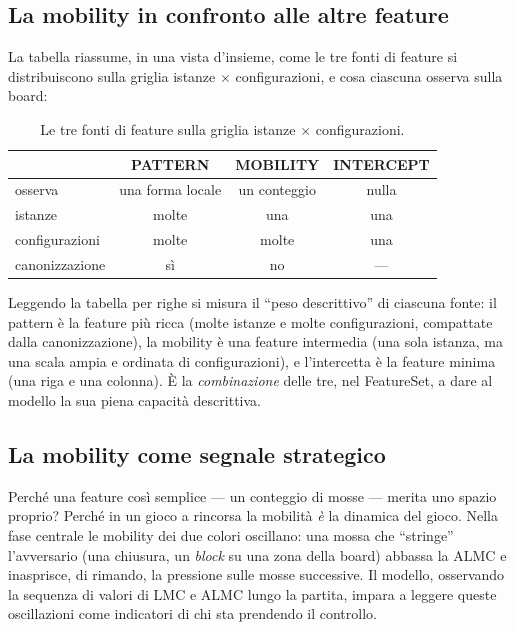 \subsection{La mobility in confronto alle altre feature}

La tabella riassume, in una vista d'insieme, come le tre fonti di feature si
distribuiscono sulla griglia istanze $\times$ configurazioni, e cosa ciascuna osserva
sulla board:

\begin{table}[ht]
\centering
\begin{tabular}{lccc}
\toprule
 & \textbf{PATTERN} & \textbf{MOBILITY} & \textbf{INTERCEPT} \\
\midrule
osserva        & una forma locale & un conteggio & nulla \\
istanze        & molte & una & una \\
configurazioni & molte & molte & una \\
canonizzazione & sì & no & --- \\
\bottomrule
\end{tabular}
\caption{Le tre fonti di feature sulla griglia istanze $\times$ configurazioni.}
\label{tab:feature-sources}
\end{table}

Leggendo la tabella per righe si misura il ``peso descrittivo'' di ciascuna fonte: il
pattern è la feature più ricca (molte istanze e molte configurazioni, compattate dalla
canonizzazione), la mobility è una feature intermedia (una sola istanza, ma una scala
ampia e ordinata di configurazioni), e l'intercetta è la feature minima (una riga e
una colonna). È la \textit{combinazione} delle tre, nel FeatureSet, a dare al modello
la sua piena capacità descrittiva.

\subsection{La mobility come segnale strategico}

Perché una feature così semplice --- un conteggio di mosse --- merita uno spazio
proprio? Perché in un gioco a rincorsa la mobilità \textit{è} la dinamica del gioco.
Nella fase centrale le mobility dei due colori oscillano: una mossa che ``stringe''
l'avversario (una chiusura, un \textit{block} su una zona della board) abbassa la ALMC
e inasprisce, di rimando, la pressione sulle mosse successive. Il modello, osservando
la sequenza di valori di LMC e ALMC lungo la partita, impara a leggere queste
oscillazioni come indicatori di chi sta prendendo il controllo.

